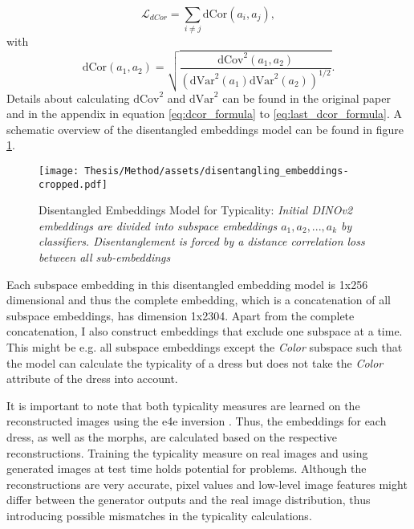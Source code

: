 $$\mathcal{L}_{dCor} = \sum_{i \neq j} \text{dCor}(a_i, a_j),$$
with 
$$\text{dCor}(a_1, a_2) = \sqrt{\frac{\text{dCov}^2(a_1, a_2)}{(\text{dVar}^2(a_1) \text{dVar}^2(a_2))^{1/2}}}.$$
Details about calculating $\text{dCov}^2$ and $\text{dVar}^2$ can be found in the original paper \citep[p.5]{muller2024disentangling} and in the appendix in equation \ref{eq:dcor_formula} to \ref{eq:last_dcor_formula}. A schematic overview of the disentangled embeddings model can be found in figure \ref{fig:disentangling_embeddings}.

\begin{figure}[ht!]
    \centering
    \texttt{[image: Thesis/Method/assets/disentangling\_embeddings-cropped.pdf]}
    \caption[Disentangled Embeddings Model for Typicality]{Disentangled Embeddings Model for Typicality: \textit{Initial DINOv2 embeddings are divided into subspace embeddings $a_1,a_2,...,a_k$ by classifiers. Disentanglement is forced by a distance correlation loss between all sub-embeddings}}
    \label{fig:disentangling_embeddings}
\end{figure}

Each subspace embedding in this disentangled embedding model is 1x256 dimensional and thus the complete embedding, which is a concatenation of all subspace embeddings, has dimension 1x2304. Apart from the complete concatenation, I also construct embeddings that exclude one subspace at a time. This might be e.g. all subspace embeddings except the \textit{Color} subspace such that the model can calculate the typicality of a dress but does not take the \textit{Color} attribute of the dress into account.


It is important to note that both typicality measures are learned on the reconstructed images using the e4e inversion \citep{tov2021designing}. Thus, the embeddings for each dress, as well as the morphs, are calculated based on the respective reconstructions. Training the typicality measure on real images and using generated images at test time holds potential for problems. Although the reconstructions are very accurate, pixel values and low-level image features might differ between the generator outputs and the real image distribution, thus introducing possible mismatches in the typicality calculations.